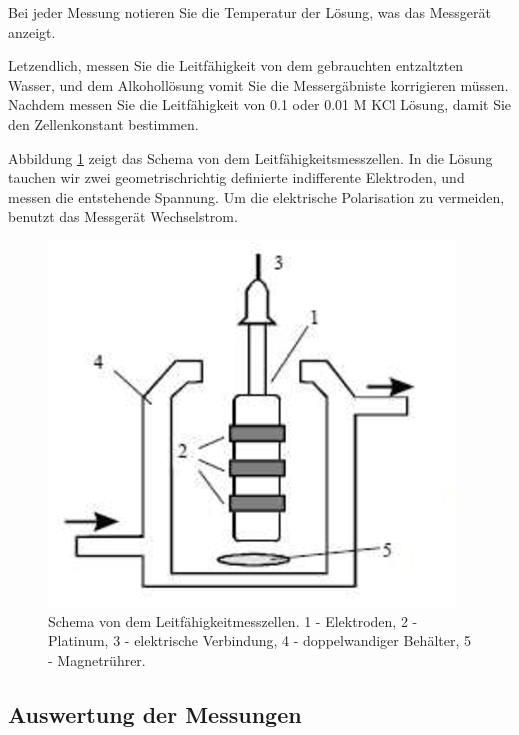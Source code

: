 Bei jeder Messung notieren Sie die Temperatur der Lösung, was das Messgerät anzeigt.

Letzendlich, messen Sie die Leitfähigkeit von dem gebrauchten entzaltzten Wasser, und dem Alkohollösung vomit Sie die Messergäbniste korrigieren müssen.
Nachdem messen Sie die Leitfähigkeit von 0.1 oder 0.01 M KCl Lösung, damit Sie den Zellenkonstant bestimmen.

Abbildung \ref{fig:vez} zeigt das Schema von dem Leitfähigkeitsmesszellen.
In die Lösung tauchen wir zwei geometrischrichtig definierte indifferente Elektroden, und messen die entstehende Spannung. 
Um die elektrische Polarisation zu vermeiden, benutzt das Messgerät Wechselstrom. 

\begin{figure}
\centering
\includegraphics{fig/cond.eps}
\caption{Schema von dem Leitfähigkeitmesszellen. 1 - Elektroden, 2 - Platinum, 3 - elektrische Verbindung, 4 - doppelwandiger Behälter, 5 - Magnetrührer.}
\label{fig:vez}
\end{figure}

\subsection{Auswertung der Messungen}

